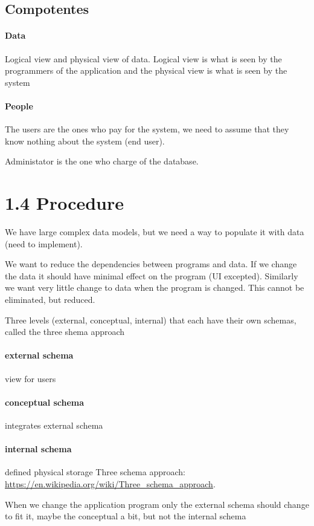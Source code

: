 \documentclass{article}
\begin{document}
\subsection{Compotentes}
\paragraph{Data}
Logical view and physical view of data. Logical view is what is seen by the programmers of the application and the physical view is what is seen by the system

\paragraph{People}
The users are the ones who pay for the system, we need to assume that they know nothing about the system (end user).

Administator is the one who charge of the database.

\section{1.4 Procedure}
We have large complex data models, but we need a way to populate it with data (need to implement).

We want to reduce the dependencies between programs and data. If we change the data it should have minimal effect on the program (UI excepted). Similarly we want very little change to data when the program is changed. This cannot be eliminated, but reduced.

Three levels (external, conceptual, internal) that each have their own schemas, called the three shema approach
\paragraph{external schema} view for users

\paragraph{conceptual schema} integrates external schema

\paragraph{internal schema} defined physical storage
Three schema approach: \url{https://en.wikipedia.org/wiki/Three_schema_approach}.

When we change the application program only the external schema should change to fit it, maybe the conceptual a bit, but not the internal schema
\end{document}

